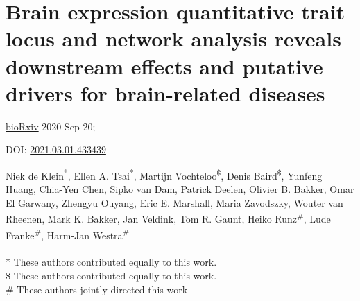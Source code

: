 \chapterfont{\huge\color{DarkOrange}}  %
\sectionfont{\color{DarkOrange}}  %
\subsectionfont{\color{DarkOrange}}  %

\renewcommand\pcolor{DarkOrange}
\renewcommand{\headrule}{\hbox to\headwidth{%
		\color{DarkOrange}\leaders\hrule height \headrulewidth\hfill}} %
\fancyfoot[LE,RO]{\thepage}

{ \Large {} }

\cleardoublepage
\makeatletter
\let\savedchap\@makechapterhead
\def\@makechapterhead{\vspace*{-3cm}\savedchap}
\chapter[Brain expression quantitative trait locus and network analysis reveals downstream effects and putative drivers for brain-related diseases ]{Brain expression quantitative trait locus and network analysis reveals downstream effects and putative drivers for brain-related diseases}

\chaptermark{}
\let\@makechapterhead\savedchap
\makeatletter
\label{chap:chapter5-brain}

\hfill \underline{bioRxiv} 2020 Sep 20;

\hfill DOI: \href{https://doi.org/10.1101/2021.03.01.433439 }{2021.03.01.433439}


Niek de Klein\textsuperscript{*}, Ellen A. Tsai\textsuperscript{*}, Martijn Vochteloo\textsuperscript{\$}, Denis Baird\textsuperscript{\$}, Yunfeng Huang, Chia-Yen Chen, Sipko van Dam, Patrick Deelen, Olivier B. Bakker, Omar El Garwany, Zhengyu Ouyang, Eric E. Marshall, Maria Zavodszky, Wouter van Rheenen, Mark K. Bakker, Jan Veldink, Tom R. Gaunt, Heiko Runz\textsuperscript{\#}, Lude Franke\textsuperscript{\#}, Harm-Jan Westra\textsuperscript{\#}
\\
\\
* These authors contributed equally to this work. \\
\$ These authors contributed equally to this work. \\
\# These authors jointly directed this work

